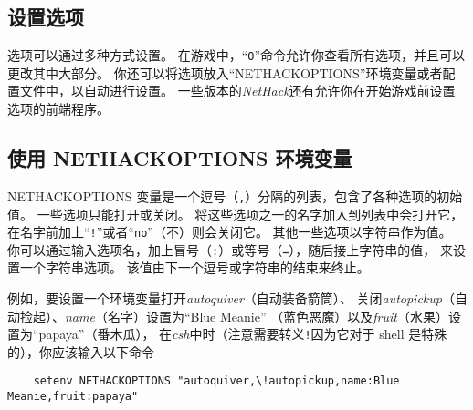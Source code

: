 \documentclass[a4paper, 10pt]{article}
\begin{document}
\subsection*{设置选项}

选项可以通过多种方式设置。
在游戏中，“{\tt O}”命令允许你查看所有选项，并且可以更改其中大部分。
你还可以将选项放入“NETHACKOPTIONS”环境变量或者配置文件中，以自动进行设置。
一些版本的{\it NetHack\/}还有允许你在开始游戏前设置选项的前端程序。

\subsection*{使用 NETHACKOPTIONS 环境变量}

NETHACKOPTIONS 变量是一个逗号（{\tt ,}）分隔的列表，包含了各种选项的初始值。
一些选项只能打开或关闭。
将这些选项之一的名字加入到列表中会打开它，
在名字前加上“{\tt !}”或者“{\tt no}”（不）则会关闭它。
其他一些选项以字符串作为值。
你可以通过输入选项名，加上冒号（{\tt :}）或等号（{\tt =}），随后接上字符串的值，
来设置一个字符串选项。
该值由下一个逗号或字符串的结束来终止。

例如，要设置一个环境变量打开{\it autoquiver\/}（自动装备箭筒）、
关闭{\it autopickup\/}（自动捡起）、{\it name\/}（名字）设置为“Blue Meanie”
（蓝色恶魔）以及{\it fruit\/}（水果）设置为“papaya”（番木瓜），
在{\it csh}中时（注意需要转义{\tt !}因为它对于 shell 是特殊的），你应该输入以下命令
\begin{verbatim}
    setenv NETHACKOPTIONS "autoquiver,\!autopickup,name:Blue Meanie,fruit:papaya"
\end{verbatim}
\end{document}
